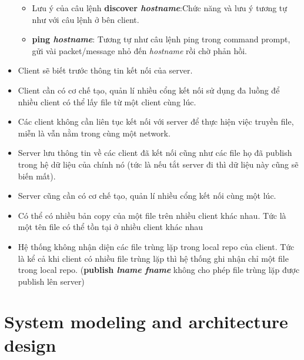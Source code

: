\documentclass[a4paper]{article}
\begin{document}
\begin{itemize}
\begin{itemize}
			\item Lưu ý của câu lệnh \textbf{discover \textit{hostname}}:Chức năng và lưu ý tương tự như với câu lệnh ở bên client. 
			\item \textbf{ping \textit{hostname}}: Tương tự như câu lệnh ping trong command prompt, gửi vài packet/message nhỏ đến \textit{hostname} rồi chờ phản hồi.
		\end{itemize}
		\item Client sẽ biết trước thông tin kết nối của server.
		\item Client cần có cơ chế tạo, quản lí nhiều cổng kết nối sử dụng đa luồng để nhiều client có thể lấy file từ một client cùng lúc.
		\item Các client không cần liên tục kết nối với server để thực hiện việc truyền file, miễn là vẫn nằm trong cùng một network.
		\item Server lưu thông tin về các client đã kết nối cũng như các file họ đã publish trong hệ dữ liệu của chính nó (tức là nếu tắt server đi thì dữ liệu này cũng sẽ biến mất).
		\item Server cũng cần có cơ chế tạo, quản lí nhiều cổng kết nối cùng một lúc.
		\item Có thể có nhiều bản copy của một file trên nhiều client khác nhau. Tức là một tên file có thể tồn tại ở nhiều client khác nhau
		\item Hệ thống không nhận diện các file trùng lặp trong local repo của client. Tức là kể cả khi client có nhiều file trùng lặp thì hệ thống ghi nhận chỉ một file trong local repo. (\textbf{publish \textit{lname fname}} không cho phép file trùng lặp được publish lên server)
	\end{itemize}
	
	\section{System modeling and architecture design}
\end{document}
